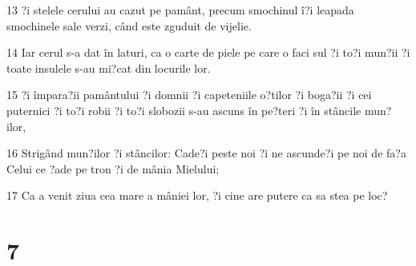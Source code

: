 \par 13 ?i stelele cerului au cazut pe pamânt, precum smochinul î?i leapada smochinele sale verzi, când este zguduit de vijelie.
\par 14 Iar cerul s-a dat în laturi, ca o carte de piele pe care o faci sul ?i to?i mun?ii ?i toate insulele s-au mi?cat din locurile lor.
\par 15 ?i împara?ii pamântului ?i domnii ?i capeteniile o?tilor ?i boga?ii ?i cei puternici ?i to?i robii ?i to?i slobozii s-au ascuns în pe?teri ?i în stâncile mun?ilor,
\par 16 Strigând mun?ilor ?i stâncilor: Cade?i peste noi ?i ne ascunde?i pe noi de fa?a Celui ce ?ade pe tron ?i de mânia Mielului;
\par 17 Ca a venit ziua cea mare a mâniei lor, ?i cine are putere ca sa stea pe loc?

\chapter{7}

